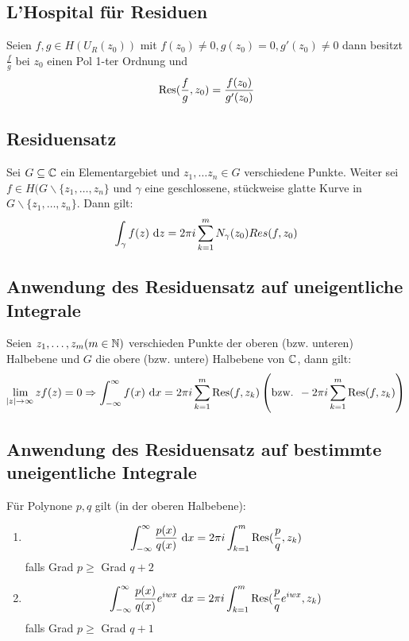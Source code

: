 \subsection{L'Hospital für Residuen}
Seien $f,g \in H(U_R(z_0))$ mit $f(z_0) \neq 0,
g(z_0) = 0, g'(z_0) \neq 0$ dann besitzt $\frac{f}{g}$
bei $z_0$ einen Pol 1-ter Ordnung und
\begin{equation*}
    \operatorname{Res}(\frac{f}{g}, z_0) = \frac{f(z_0)}{g'(z_0)} 
\end{equation*}

\subsection{Residuensatz}
Sei $G \subseteq \mathbb{C}$ ein Elementargebiet und
$z_1, \ldots z_n \in G$ verschiedene Punkte. Weiter sei
$f \in H(G\backslash \{z_1, \ldots, z_n\}$ und $\gamma$
eine geschlossene, stückweise glatte Kurve in
$G \backslash \{z_1, \ldots, z_n\}$. Dann gilt:
\begin{equation*}
    \int_\gamma f(z) \text{ d}z = 2 \pi i \sum_{k=1}^m
    N_\gamma (z_0) Res(f, z_0)
\end{equation*}

\subsection{Anwendung des Residuensatz auf uneigentliche Integrale}
Seien $z_1, \ldots, z_m (m \in \mathbb{N})$ verschieden Punkte
der oberen (bzw. unteren) Halbebene und $G$ die obere
(bzw. untere) Halbebene von $\mathbb{C}$, dann gilt:
\begin{equation*}
    \lim_{\abs{z} \to \infty} z f(z) = 0 \Rightarrow
    \int_{-\infty}^\infty f(x) \text{ d}x = 
    2 \pi i \sum_{k=1}^m \operatorname{Res}(f, z_k) \left(
    \text{bzw. } -2 \pi i \sum_{k=1}^m \operatorname{Res}(f, z_k)
    \right)
\end{equation*}

\subsection{Anwendung des Residuensatz auf bestimmte uneigentliche Integrale}
Für Polynone $p, q$ gilt (in der oberen Halbebene):
\begin{enumerate}
    \item 
        \begin{equation*}
            \int_{-\infty}^\infty \frac{p(x)}{q(x)}\text{ d}x=
            2 \pi i \int_{k=1}^m \operatorname{Res}(\frac{p}{q},z_k)
        \end{equation*}
        falls Grad $p \geq$ Grad $q +2$
    \item 
        \begin{equation*}
            \int_{-\infty}^\infty \frac{p(x)}{q(x)} 
            e^{iwx} \text{ d}x=
            2 \pi i \int_{k=1}^m \operatorname{Res}(\frac{p}{q}
            e^{iwx},z_k)
        \end{equation*}
        falls Grad $p \geq$ Grad $q +1$
\end{enumerate}



